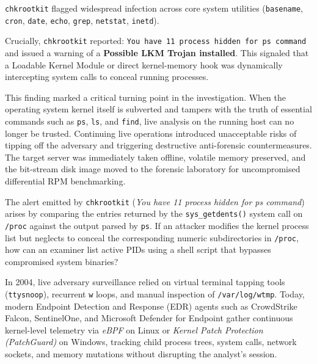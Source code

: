 \vspace{1em}

\texttt{chkrootkit} flagged widespread infection across core system utilities (\texttt{basename}, \texttt{cron}, \texttt{date}, \texttt{echo}, \texttt{grep}, \texttt{netstat}, \texttt{inetd}). 

Crucially, \texttt{chkrootkit} reported: \texttt{You have 11 process hidden for ps command} and issued a warning of a \textbf{Possible LKM Trojan installed}. This signaled that a Loadable Kernel Module or direct kernel-memory hook was dynamically intercepting system calls to conceal running processes.

This finding marked a critical turning point in the investigation. When the operating system kernel itself is subverted and tampers with the truth of essential commands such as \texttt{ps}, \texttt{ls}, and \texttt{find}, live analysis on the running host can no longer be trusted. Continuing live operations introduced unacceptable risks of tipping off the adversary and triggering destructive anti-forensic countermeasures. The target server was immediately taken offline, volatile memory preserved, and the bit-stream disk image moved to the forensic laboratory for uncompromised differential RPM benchmarking.

\begin{retoforense}
The alert emitted by \texttt{chkrootkit} (\textit{You have 11 process hidden for ps command}) arises by comparing the entries returned by the \texttt{sys\_getdents()} system call on \texttt{/proc} against the output parsed by \texttt{ps}. If an attacker modifies the kernel process list but neglects to conceal the corresponding numeric subdirectories in \texttt{/proc}, how can an examiner list active PIDs using a shell script that bypasses compromised system binaries?
\end{retoforense}

\begin{perspectiva20}
In 2004, live adversary surveillance relied on virtual terminal tapping tools (\texttt{ttysnoop}), recurrent \texttt{w} loops, and manual inspection of \texttt{/var/log/wtmp}. Today, modern Endpoint Detection and Response (EDR) agents such as CrowdStrike Falcon, SentinelOne, and Microsoft Defender for Endpoint gather continuous kernel-level telemetry via \textit{eBPF} on Linux or \textit{Kernel Patch Protection (PatchGuard)} on Windows, tracking child process trees, system calls, network sockets, and memory mutations without disrupting the analyst's session.
\end{perspectiva20}
